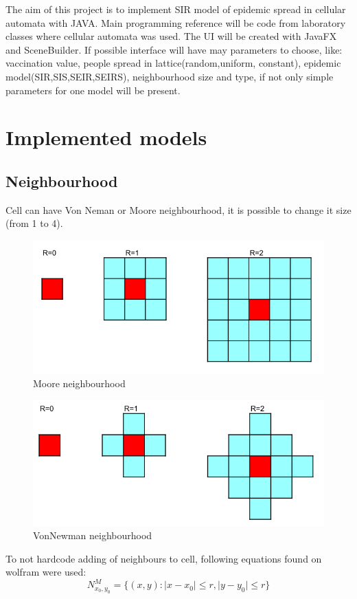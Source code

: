 \documentclass[a4paper, 11pt]{article}
\begin{document}
The aim of this project is to implement SIR model of epidemic spread in cellular automata with JAVA. Main programming reference will be code from laboratory classes where cellular automata was used. The UI will be created with JavaFX and SceneBuilder. If possible interface  will have may parameters to choose, like: vaccination value,  people spread in lattice(random,uniform, constant), epidemic model(SIR,SIS,SEIR,SEIRS), neighbourhood size and type, if not only simple parameters for one model will be present. 

\section{Implemented models}
\subsection{Neighbourhood}
Cell can have Von Neman or Moore neighbourhood, it is possible to change it size (from 1 to 4).
\begin{figure}[H]
\includegraphics[scale=0.5]{moore.png} 
\caption{Moore neighbourhood}
\end{figure}
\begin{figure}[H]
\includegraphics[scale=0.5]{vonnewman.png} 
\caption{VonNewman neighbourhood}
\end{figure}
To not hardcode adding of neighbours to cell, following equations found on wolfram \cite{moore}\cite{vonnewman} were used:\\
\begin{equation}
	N^{M}_{x_0,y_0}=\{ \left(x,y\right): \mid x-x_0 \mid \leq r, \mid y-y_0 \mid \leq r   \}  
\end{equation}
\end{document}
